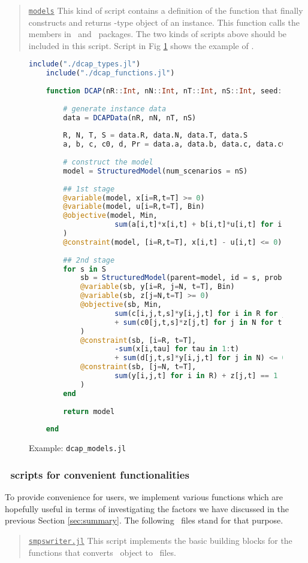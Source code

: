 \begin{quote}
\noindent\underline{\texttt{models}} This kind of script contains a definition of the function that finally constructs and returns \jumpmodel-type object of an instance. This function calls the members in \jump\ and \structjump\ packages. The two kinds of scripts above should be included in this script. Script in Fig \ref{fig:dcap_models} shows the example of \dcap.
\end{quote}
\begin{figure}[]
	\centering
	\begin{lstlisting}[frame=single,language=julia]
	include("./dcap_types.jl")
	include("./dcap_functions.jl")
	
	function DCAP(nR::Int, nN::Int, nT::Int, nS::Int, seed::Int)::JuMP.Model
	
		# generate instance data
		data = DCAPData(nR, nN, nT, nS)
		
		R, N, T, S = data.R, data.N, data.T, data.S
		a, b, c, c0, d, Pr = data.a, data.b, data.c, data.c0, data.d, data.Pr
		
		# construct the model
		model = StructuredModel(num_scenarios = nS)
		
		## 1st stage
		@variable(model, x[i=R,t=T] >= 0)
		@variable(model, u[i=R,t=T], Bin)
		@objective(model, Min, 
					sum(a[i,t]*x[i,t] + b[i,t]*u[i,t] for i in R for t in T)
		)
		@constraint(model, [i=R,t=T], x[i,t] - u[i,t] <= 0)
		
		## 2nd stage
		for s in S
			sb = StructuredModel(parent=model, id = s, prob = Pr[s])
			@variable(sb, y[i=R, j=N, t=T], Bin)
			@variable(sb, z[j=N,t=T] >= 0)
			@objective(sb, Min, 
					sum(c[i,j,t,s]*y[i,j,t] for i in R for j in N for t in T) 
					+ sum(c0[j,t,s]*z[j,t] for j in N for t in T)
			)
			@constraint(sb, [i=R, t=T], 
					-sum(x[i,tau] for tau in 1:t) 
					+ sum(d[j,t,s]*y[i,j,t] for j in N) <= 0)
			@constraint(sb, [j=N, t=T], 
					sum(y[i,j,t] for i in R) + z[j,t] == 1
			)
		end
	
		return model
		
	end
	\end{lstlisting}
	\caption{Example: \texttt{dcap\_models.jl}}\label{fig:dcap_models}
\end{figure}

\subsubsection{\julia\ scripts for convenient functionalities}
To provide convenience for users, we implement various functions which are hopefully useful in terms of investigating the factors we have discussed in the previous Section \ref{sec:summary}. The following \julia\ files stand for that purpose.
\begin{quotation}
	\noindent\underline{\texttt{smpswriter.jl}} This script implements the basic building blocks for the functions that converts \jumpmodel\ object to \smps\ files. 
\end{quotation}


